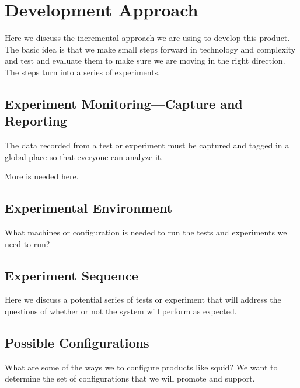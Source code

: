 \chapter{Development Approach}

\begin{fixme}
Here we discuss the incremental approach we are using to develop this
product. The basic idea is that we make small steps forward in
technology and complexity and test and evaluate them to make sure we
are moving in the right direction. The steps turn into a series of
experiments.
\end{fixme}

\section{Experiment Monitoring---Capture and Reporting}

The data recorded from a test or experiment must be captured and
tagged in a global place so that everyone can analyze it.

\begin{fixme}
More is needed here.
\end{fixme}

\section{Experimental Environment}

\begin{fixme}
What machines or configuration is needed to run the tests and
experiments we need to run?
\end{fixme}

\section{Experiment Sequence}

\begin{fixme}
Here we discuss a potential series of tests or experiment that will
address the questions of whether or not the system will perform as
expected.
\end{fixme}

\section{Possible Configurations}

\begin{fixme}
What are some of the ways we to configure products like squid? We want
to determine the set of configurations that we will promote and
support.
\end{fixme}

